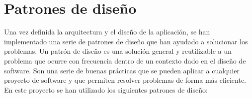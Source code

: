 \newpage

\section{Patrones de diseño}\label{subsec:patrones-de-diseno}

Una vez definida la arquitectura y el diseño de la aplicación, se han implementado una serie de patrones de diseño que
han ayudado a solucionar los problemas. Un patrón de diseño es una solución general y reutilizable a un problema que
ocurre con frecuencia dentro de un contexto dado en el diseño de software. Son una serie de buenas prácticas que se
pueden aplicar a cualquier proyecto de software y que permiten resolver problemas de forma más eficiente. \\

En este proyecto se han utilizado los siguientes patrones de diseño:

